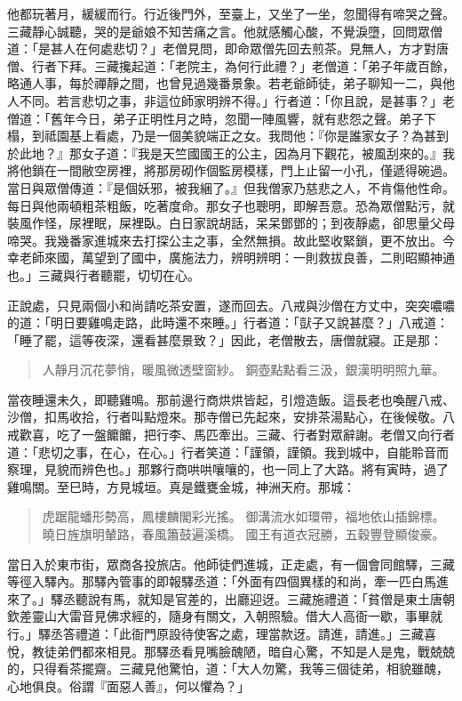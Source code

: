 他都玩著月，緩緩而行。行近後門外，至臺上，又坐了一坐，忽聞得有啼哭之聲。三藏靜心誠聽，哭的是爺娘不知苦痛之言。他就感觸心酸，不覺淚墮，回問眾僧道：「是甚人在何處悲切？」老僧見問，即命眾僧先回去煎茶。見無人，方才對唐僧、行者下拜。三藏攙起道：「老院主，為何行此禮？」老僧道：「弟子年歲百餘，略通人事，每於禪靜之間，也曾見過幾番景象。若老爺師徒，弟子聊知一二，與他人不同。若言悲切之事，非這位師家明辨不得。」行者道：「你且說，是甚事？」老僧道：「舊年今日，弟子正明性月之時，忽聞一陣風響，就有悲怨之聲。弟子下榻，到祗園基上看處，乃是一個美貌端正之女。我問他：『你是誰家女子？為甚到於此地？』那女子道：『我是天竺國國王的公主，因為月下觀花，被風刮來的。』我將他鎖在一間敝空房裡，將那房砌作個監房模樣，門上止留一小孔，僅遞得碗過。當日與眾僧傳道：『是個妖邪，被我綑了。』但我僧家乃慈悲之人，不肯傷他性命。每日與他兩頓粗茶粗飯，吃著度命。那女子也聰明，即解吾意。恐為眾僧點污，就裝風作怪，尿裡眠，屎裡臥。白日家說胡話，呆呆鄧鄧的；到夜靜處，卻思量父母啼哭。我幾番家進城來去打探公主之事，全然無損。故此堅收緊鎖，更不放出。今幸老師來國，萬望到了國中，廣施法力，辨明辨明：一則救拔良善，二則昭顯神通也。」三藏與行者聽罷，切切在心。

正說處，只見兩個小和尚請吃茶安置，遂而回去。八戒與沙僧在方丈中，突突噥噥的道：「明日要雞鳴走路，此時還不來睡。」行者道：「獃子又說甚麼？」八戒道：「睡了罷，這等夜深，還看甚麼景致？」因此，老僧散去，唐僧就寢。正是那：
\begin{quote}
人靜月沉花夢悄，暖風微透壁窗紗。
銅壺點點看三汲，銀漢明明照九華。
\end{quote}

當夜睡還未久，即聽雞鳴。那前邊行商烘烘皆起，引燈造飯。這長老也喚醒八戒、沙僧，扣馬收拾，行者叫點燈來。那寺僧已先起來，安排茶湯點心，在後候敬。八戒歡喜，吃了一盤饝饝，把行李、馬匹牽出。三藏、行者對眾辭謝。老僧又向行者道：「悲切之事，在心，在心。」行者笑道：「謹領，謹領。我到城中，自能聆音而察理，見貌而辨色也。」那夥行商哄哄嚷嚷的，也一同上了大路。將有寅時，過了雞鳴關。至巳時，方見城垣。真是鐵甕金城，神洲天府。那城：
\begin{quote}
虎踞龍蟠形勢高，鳳樓麟閣彩光搖。
御溝流水如環帶，福地依山插錦標。
曉日旌旗明輦路，春風簫鼓遍溪橋。
國王有道衣冠勝，五穀豐登顯俊豪。
\end{quote}

當日入於東市街，眾商各投旅店。他師徒們進城，正走處，有一個會同館驛，三藏等徑入驛內。那驛內管事的即報驛丞道：「外面有四個異樣的和尚，牽一匹白馬進來了。」驛丞聽說有馬，就知是官差的，出廳迎迓。三藏施禮道：「貧僧是東土唐朝欽差靈山大雷音見佛求經的，隨身有關文，入朝照驗。借大人高衙一歇，事畢就行。」驛丞答禮道：「此衙門原設待使客之處，理當款迓。請進，請進。」三藏喜悅，教徒弟們都來相見。那驛丞看見嘴臉醜陋，暗自心驚，不知是人是鬼，戰兢兢的，只得看茶擺齋。三藏見他驚怕，道：「大人勿驚，我等三個徒弟，相貌雖醜，心地俱良。俗謂『面惡人善』，何以懼為？」

